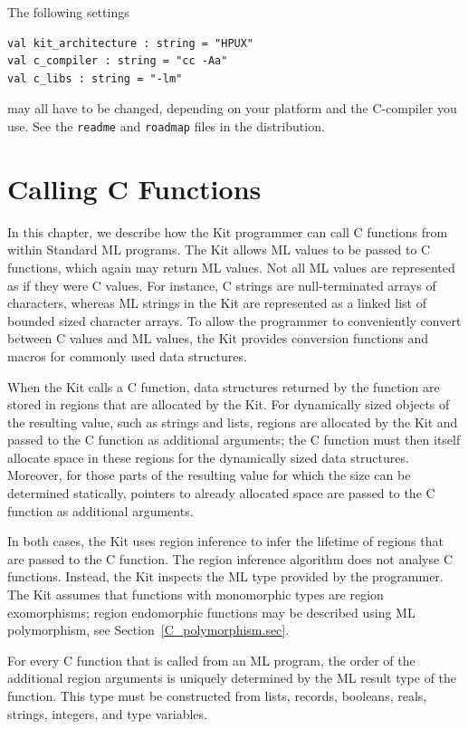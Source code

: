 \documentclass[12pt]{book}
\begin{document}
The following settings
\begin{verbatim}
val kit_architecture : string = "HPUX"
val c_compiler : string = "cc -Aa"
val c_libs : string = "-lm"
\end{verbatim}
may all have to be changed, depending on your platform and
the C-compiler you use.  See the {\tt readme} and {\tt roadmap} files 
in the distribution.

\chapter{Calling C Functions}
\label{ccall.sec}

In this chapter, we describe how the Kit programmer can call C
functions from within Standard ML programs.  The Kit allows ML values
to be passed to C functions, which again may return ML values. Not all
ML values are represented as if they were C values. For instance, C
strings are null-terminated arrays of characters, whereas ML strings
in the Kit are represented as a linked list of bounded sized character
arrays. To allow the programmer to conveniently convert between C
values and ML values, the Kit provides conversion functions and macros
for commonly used data structures.

When the Kit calls a C function, data structures returned by the
function are stored in regions that are allocated by the Kit. For
dynamically sized objects of the resulting value, such as strings and
lists, regions are allocated by the Kit and passed to the C function
as additional arguments; the C function must then itself allocate
space in these regions for the dynamically sized data
structures. Moreover, for those parts of the resulting value for which
the size can be determined statically, pointers to already allocated
space are passed to the C function as additional arguments.

In both cases, the Kit uses region inference to infer the lifetime of
regions that are passed to the C function.  The region inference
algorithm does not analyse C functions. Instead, the Kit inspects the
ML type provided by the programmer. The Kit assumes that functions
with monomorphic types are 
%
region exomorphisms;
%
region endomorphic functions may be described using ML polymorphism,
see Section~\ref{C_polymorphism.sec}.

For every C function that is called from an ML program, the order of the
additional region arguments is uniquely determined by the ML result type
of the function.  This type must be constructed from lists, records,
booleans, reals, strings, integers, and type variables.
\end{document}
